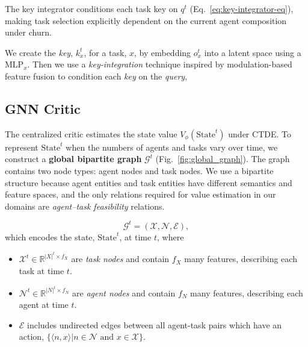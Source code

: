 The key integrator conditions each task key on $q^t$ (Eq.~\eqref{eq:key-integrator-eq}), making task selection explicitly dependent on the current agent composition under churn.

We create the \emph{key}, $k^t_x$, for a task, $x$, by embedding $o^t_x$ into a latent space using a $\mathrm{MLP}_x$. Then we use a \emph{key-integration} technique inspired by modulation-based feature fusion \cite{perez2018film} to condition each \emph{key} on the \emph{query}, 



\subsection{GNN Critic} \label{critic}

The centralized critic estimates the state value $V_\phi(\text{State}^t)$ under CTDE.
To represent $\text{State}^t$ when the numbers of agents and tasks vary over time, we construct a \textbf{global bipartite graph} $\mathcal{G}^t$ (Fig.~\ref{fig:global_graph}).
The graph contains two node types: agent nodes and task nodes.
We use a bipartite structure because agent entities and task entities have different semantics and feature spaces, and the only relations required for value estimation in our domains are \emph{agent--task feasibility} relations.


\[
\mathcal{G}^t = (\mathcal{X}, \mathcal{N}, \mathcal{E
}),
\]
which encodes the state, $\text{State}^t$, at time $t$, where 
\begin{itemize}
\item $\mathcal{X}^t \in \mathbb{R}^{|X|^t\times f_X}$ are \emph{task nodes} and contain $f_X$ many features, describing each task at time $t$.
\item $\mathcal{N}^t \in \mathbb{R}^{|N|^t\times f_N}$ are \emph{agent nodes} and contain $f_N$ many features, describing each agent at time $t$. 
\item $\mathcal{E}$ includes undirected edges between all agent-task pairs which have an action, $\{\langle n,x\rangle | n\in \mathcal{N} \text{ and }x\in \mathcal{X}\}$.  
\end{itemize}

